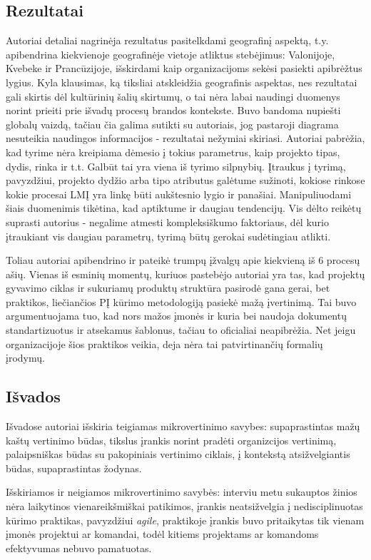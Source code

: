 \documentclass{VUMIFPSkursinis}
\begin{document}
\subsection{Rezultatai}
Autoriai detaliai nagrinėja rezultatus pasitelkdami geografinį aspektą, t.y. apibendrina kiekvienoje geografinėje vietoje atliktus stebėjimus: Valonijoje, Kvebeke ir Prancūzijoje, išskirdami kaip organizacijoms sekėsi pasiekti apibrėžtus lygius. Kyla klausimas, ką tiksliai atskleidžia geografinis aspektas, nes rezultatai gali skirtis dėl kultūrinių šalių skirtumų, o tai nėra labai naudingi duomenys norint prieiti prie išvadų procesų brandos kontekste. Buvo bandoma nupiešti globalų vaizdą, tačiau čia galima sutikti su autoriais, jog pastaroji diagrama nesuteikia naudingos informacijos - rezultatai nežymiai skiriasi. Autoriai pabrėžia, kad tyrime nėra kreipiama dėmesio į tokius parametrus, kaip projekto tipas, dydis, rinka ir t.t. Galbūt tai yra viena iš tyrimo silpnybių. Įtraukus į tyrimą, pavyzdžiui, projekto dydžio arba tipo atributus galėtume sužinoti, kokiose rinkose kokie procesai LMĮ yra linkę būti aukštesnio lygio ir panašiai. Manipuliuodami šiais duomenimis tikėtina, kad aptiktume ir daugiau tendencijų. Vis dėlto reikėtų suprasti autorius - negalime atmesti kompleksiškumo faktoriaus, dėl kurio įtraukiant vis daugiau parametrų, tyrimą būtų gerokai sudėtingiau atlikti.

Toliau autoriai apibendrino ir pateikė trumpų įžvalgų apie kiekvieną iš 6 procesų ašių. Vienas iš esminių momentų, kuriuos pastebėjo autoriai yra tas, kad projektų gyvavimo ciklas ir sukuriamų produktų struktūra pasirodė gana gerai, bet praktikos, liečiančios PĮ kūrimo metodologiją pasiekė mažą įvertinimą. Tai buvo argumentuojama tuo, kad nors mažos įmonės ir kuria bei naudoja dokumentų standartizuotus ir atsekamus šablonus, tačiau to oficialiai neapibrėžia. Net jeigu organizacijoje šios praktikos veikia, deja nėra tai patvirtinančių formalių įrodymų.

\subsection{Išvados}
Išvadose autoriai išskiria teigiamas mikrovertinimo savybes: supaprastintas mažų kaštų vertinimo būdas, tikslus įrankis norint pradėti organizcijos vertinimą, palaipsniškas būdas su pakopiniais vertinimo ciklais, į kontekstą atsižvelgiantis būdas, supaprastintas žodynas.

Išskiriamos ir neigiamos mikrovertinimo savybės: interviu metu sukauptos žinios nėra laikytinos vienareikšmiškai patikimos, įrankis neatsižvelgia į nedisciplinuotas kūrimo praktikas, pavyzdžiui \textit{agile}, praktikoje įrankis buvo pritaikytas tik vienam įmonės projektui ar komandai, todėl kitiems projektams ar komandoms efektyvumas nebuvo pamatuotas.
\end{document}
